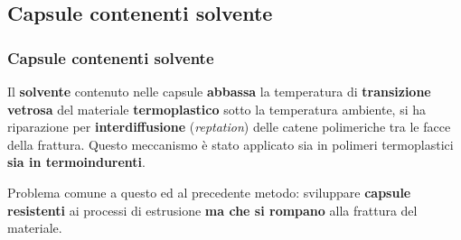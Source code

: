 \subsection{Capsule contenenti solvente}
\begin{frame}\frametitle{Capsule contenenti solvente}
Il \textbf{solvente} contenuto nelle capsule \textbf{abbassa} la temperatura di \textbf{transizione vetrosa} del materiale \textbf{termoplastico} sotto la temperatura ambiente, si ha riparazione per \textbf{interdiffusione} (\emph{reptation}) delle catene polimeriche tra le facce della frattura.
Questo meccanismo è stato applicato sia in polimeri termoplastici \textbf{sia in termoindurenti}.

\vspace{20pt}

Problema comune a questo ed al precedente metodo: sviluppare \textbf{capsule resistenti} ai processi di estrusione \textbf{ma che si rompano} alla frattura del materiale.


\end{frame}


